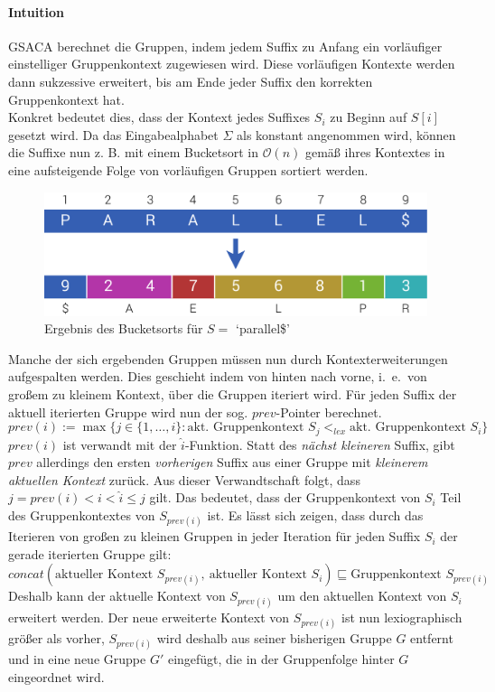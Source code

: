 \documentclass[twoside,11pt]{article}
\theoremstyle{break}
\begin{document}
\paragraph{Intuition} GSACA berechnet die Gruppen, indem jedem Suffix zu Anfang ein vorläufiger einstelliger Gruppenkontext zugewiesen wird. Diese vorläufigen Kontexte werden dann sukzessive erweitert, bis am Ende jeder Suffix den korrekten Gruppenkontext hat.\\

Konkret bedeutet dies, dass der Kontext jedes Suffixes $S_i$ zu Beginn auf $S[i]$ gesetzt wird. Da das Eingabealphabet $\Sigma$ als konstant angenommen wird, können die Suffixe nun z. B. mit einem Bucketsort in $\mathcal{O}(n)$ gemäß ihres Kontextes in eine aufsteigende Folge von vorläufigen Gruppen sortiert werden.

\begin{figure}[h]
	\centering
	\includegraphics[width=0.5\linewidth,bb=0 0 640 207]{./assets/bucketsort.pdf}
	\caption{Ergebnis des Bucketsorts für $S =$ `parallel\$'}
\label{fig:bucketsort}
\end{figure}

Manche der sich ergebenden Gruppen müssen nun durch Kontexterweiterungen aufgespalten werden. Dies geschieht indem von hinten nach vorne, i.~e.\ von großem zu kleinem Kontext, über die Gruppen iteriert wird. Für jeden Suffix der aktuell iterierten Gruppe wird nun der sog. $prev$-Pointer berechnet.
$$prev(i) := \max \{ j \in \{ 1, \dots, i \}: \text{akt. Gruppenkontext } S_j <_{lex} \text{akt. Gruppenkontext } S_i \}$$
$prev(i)$ ist verwandt mit der $\widehat{i}$-Funktion. Statt des \textit{nächst kleineren} Suffix, gibt $prev$ allerdings den ersten \textit{vorherigen} Suffix aus einer Gruppe mit \textit{kleinerem aktuellen Kontext} zurück. Aus dieser Verwandtschaft folgt, dass $j = prev(i) < i < \widehat{i} \le \widehat{j}$ gilt. Das bedeutet, dass der Gruppenkontext von $S_i$ Teil des Gruppenkontextes von $S_{prev(i)}$ ist. Es lässt sich zeigen, dass durch das Iterieren von großen zu kleinen Gruppen in jeder Iteration für jeden Suffix $S_i$ der gerade iterierten Gruppe gilt:
$$concat(\text{aktueller Kontext } S_{prev(i)},\ \text{aktueller Kontext } S_i) \sqsubseteq \text{Gruppenkontext } S_{prev(i)}$$
Deshalb kann der aktuelle Kontext von $S_{prev(i)}$ um den aktuellen Kontext von $S_i$ erweitert werden. Der neue erweiterte Kontext von $S_{prev(i)}$ ist nun lexiographisch größer als vorher, $S_{prev(i)}$ wird deshalb aus seiner bisherigen Gruppe $G$ entfernt und in eine neue Gruppe $G'$ eingefügt, die in der Gruppenfolge hinter $G$ eingeordnet wird.
\end{document}

